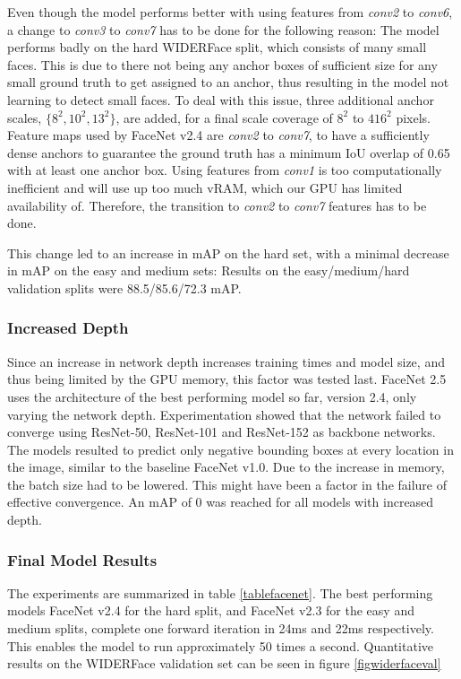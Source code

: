 \documentclass[paperwidth=48in,paperheight=48in, fontscale=0.4166666666666, landscape]{baposter}
\begin{document}
\begin{poster}
{Even though the model performs better with using features from \textit{conv2} to \textit{conv6}, a change to \textit{conv3} to \textit{conv7} has to be done for the following reason: The model performs badly on the hard WIDERFace split, which consists of many small faces. This is due to there not being any anchor boxes of sufficient size for any small ground truth to get assigned to an anchor, thus resulting in the model not learning to detect small faces. To deal with this issue, three additional anchor scales, $\{8^2, 10^2, 13^2\}$, are added, for a final scale coverage of $8^2$ to $416^2$ pixels. Feature maps used by FaceNet v2.4 are \textit{conv2} to \textit{conv7}, to have a sufficiently dense anchors to guarantee the ground truth has a minimum IoU overlap of 0.65 with at least one anchor box. Using features from \textit{conv1} is too computationally inefficient and will use up too much vRAM, which our GPU has limited availability of. Therefore, the transition to \textit{conv2} to \textit{conv7} features has to be done.

This change led to an increase in mAP on the hard set, with a minimal decrease in mAP on the easy and medium sets: Results on the easy/medium/hard validation splits were 88.5/85.6/72.3 mAP.

\subsubsection{Increased Depth}
Since an increase in network depth increases training times and model size, and thus being limited by the GPU memory, this factor was tested last. FaceNet 2.5 uses the architecture of the best performing model so far, version 2.4, only varying the network depth. Experimentation showed that the network failed to converge using ResNet-50, ResNet-101 and ResNet-152 as backbone networks. The models resulted to predict only negative bounding boxes at every location in the image, similar to the baseline FaceNet v1.0. Due to the increase in memory, the batch size had to be lowered. This might have been a factor in the failure of effective convergence. An mAP of 0 was reached for all models with increased depth.

\subsubsection{Final Model Results}
The experiments are summarized in table \ref{tablefacenet}. The best performing models FaceNet v2.4 for the hard split, and FaceNet v2.3 for the easy and medium splits, complete one forward iteration in 24ms and 22ms respectively. This enables the model to run approximately 50 times a second. Quantitative results on the WIDERFace validation set can be seen in figure \ref{figwiderfaceval}

}
\end{poster}
\end{document}
